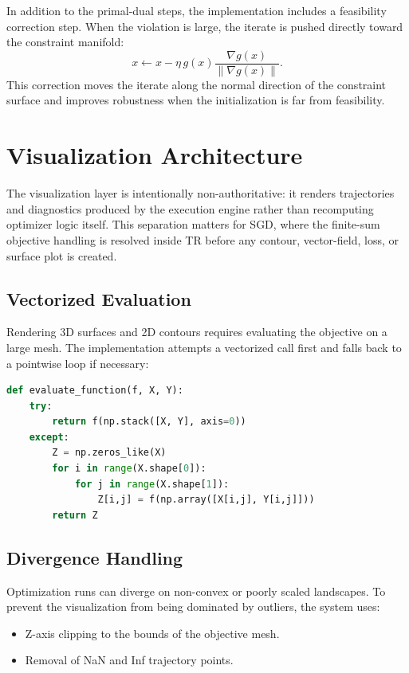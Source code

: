 \documentclass[12pt,a4paper]{report}
\begin{document}
In addition to the primal-dual steps, the implementation includes a feasibility correction step. When the violation is large, the iterate is pushed directly toward the constraint manifold:
\begin{equation}
x \leftarrow x - \eta\, g(x)\frac{\nabla g(x)}{\|\nabla g(x)\|}.
\end{equation}
This correction moves the iterate along the normal direction of the constraint surface and improves robustness when the initialization is far from feasibility.

\chapter{Visualization Architecture}

The visualization layer is intentionally non-authoritative: it renders trajectories and diagnostics produced by the execution engine rather than recomputing optimizer logic itself. This separation matters for \gls{SGD}, where the finite-sum objective handling is resolved inside \gls{TR} before any contour, vector-field, loss, or surface plot is created.

\section{Vectorized Evaluation}

Rendering 3D surfaces and 2D contours requires evaluating the objective on a large mesh. The implementation attempts a vectorized call first and falls back to a pointwise loop if necessary:
\begin{lstlisting}[language=Python]
def evaluate_function(f, X, Y):
    try:
        return f(np.stack([X, Y], axis=0))
    except:
        Z = np.zeros_like(X)
        for i in range(X.shape[0]):
            for j in range(X.shape[1]):
                Z[i,j] = f(np.array([X[i,j], Y[i,j]]))
        return Z
\end{lstlisting}

\section{Divergence Handling}

Optimization runs can diverge on non-convex or poorly scaled landscapes. To prevent the visualization from being dominated by outliers, the system uses:
\begin{itemize}
    \item Z-axis clipping to the bounds of the objective mesh.
    \item Removal of NaN and Inf trajectory points.
\end{itemize}
\end{document}
